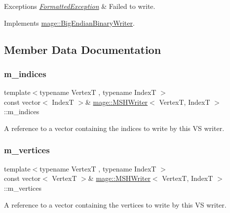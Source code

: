 \begin{DoxyExceptions}{Exceptions}
{\em \hyperlink{classmage_1_1_formatted_exception}{Formatted\+Exception}} & Failed to write. \\
\hline
\end{DoxyExceptions}


Implements \hyperlink{classmage_1_1_big_endian_binary_writer_ae6ee6613e629971502324cffc944795d}{mage\+::\+Big\+Endian\+Binary\+Writer}.



\subsection{Member Data Documentation}
\hypertarget{classmage_1_1_m_s_h_writer_a01cf9e635af683a1a9d6fa347b219dee}{}\label{classmage_1_1_m_s_h_writer_a01cf9e635af683a1a9d6fa347b219dee} 
\subsubsection{\texorpdfstring{m\+\_\+indices}{m\_indices}}
{\footnotesize\ttfamily template$<$typename VertexT , typename IndexT $>$ \\
const vector$<$ IndexT $>$\& \hyperlink{classmage_1_1_m_s_h_writer}{mage\+::\+M\+S\+H\+Writer}$<$ VertexT, IndexT $>$\+::m\+\_\+indices\hspace{0.3cm}{\ttfamily [private]}}

A reference to a vector containing the indices to write by this VS writer. \hypertarget{classmage_1_1_m_s_h_writer_ac0fc94011fd8200a83082201eee5ded5}{}\label{classmage_1_1_m_s_h_writer_ac0fc94011fd8200a83082201eee5ded5} 
\subsubsection{\texorpdfstring{m\+\_\+vertices}{m\_vertices}}
{\footnotesize\ttfamily template$<$typename VertexT , typename IndexT $>$ \\
const vector$<$ VertexT $>$\& \hyperlink{classmage_1_1_m_s_h_writer}{mage\+::\+M\+S\+H\+Writer}$<$ VertexT, IndexT $>$\+::m\+\_\+vertices\hspace{0.3cm}{\ttfamily [private]}}

A reference to a vector containing the vertices to write by this VS writer. 
